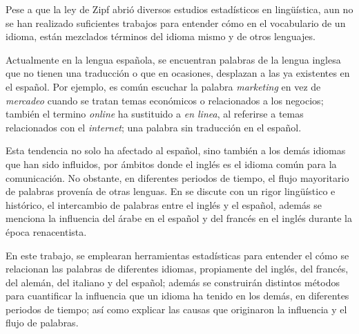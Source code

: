 Pese a que la ley de Zipf abrió diversos estudios estadísticos en lingüística, aun no se han realizado suficientes trabajos para entender cómo en el vocabulario de un idioma, están mezclados términos del idioma mismo y de otros lenguajes. 

Actualmente en la lengua española, se encuentran palabras de la lengua inglesa que no tienen una traducción o que en ocasiones, desplazan a las ya existentes en el español. Por ejemplo, es común escuchar la palabra \textit{marketing} en vez de \textit{mercadeo} cuando se tratan temas económicos o relacionados a los negocios; también el termino \textit{online} ha sustituido a \textit{en linea}, al referirse a temas relacionados con el \textit{internet}; una palabra sin traducción en el español. 

Esta tendencia no solo ha afectado al español, sino también a los demás idiomas que han sido influidos, por ámbitos donde el inglés es el idioma común para la comunicación.  No obstante,  en diferentes periodos de tiempo, el flujo mayoritario de palabras provenía de otras lenguas. En \cite{influencia_mutua} se discute con un rigor lingüístico e histórico, 
el intercambio de palabras entre el inglés y el español, además se menciona la influencia del árabe en el español y del francés en el inglés durante la época renacentista.  

En este trabajo, se emplearan herramientas estadísticas para entender el cómo se relacionan las palabras de diferentes idiomas, propiamente del inglés, del francés, del alemán, del italiano y del español;  además se construirán distintos métodos para cuantificar la influencia que un idioma ha tenido en los demás, en diferentes periodos de tiempo; así como explicar las causas que originaron la influencia y el flujo de palabras. 




